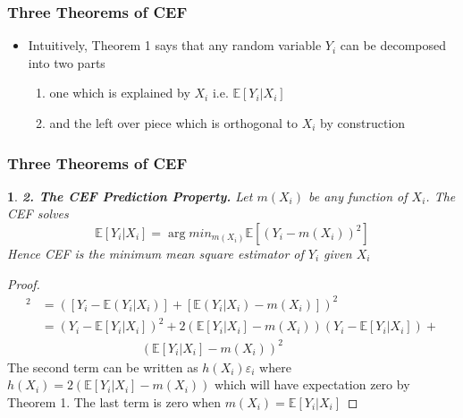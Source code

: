 \documentclass{beamer}
\theoremstyle{plain}
\newtheorem*{customthm}{} %
\newcommand{\customtheorem}[2]{
	\begin{customthm}
		\textbf{#1.} #2
	\end{customthm}
}
\begin{document}
\begin{frame}
	\frametitle{Three Theorems of CEF}
	\begin{itemize}
		\item Intuitively, Theorem 1 says  that any random variable $Y_i$ can be decomposed into two parts
		\begin{enumerate}
			\item one which is explained by $X_i$ i.e. $\mathbb E[Y_i|X_i]$
			\item and the left over piece which is orthogonal to $X_i$ by construction
		\end{enumerate}
	\end{itemize}
\end{frame}

\begin{frame}
	\frametitle{Three Theorems of CEF}

\customtheorem{2. The CEF Prediction Property}{		Let $m(X_i)$ be any function of $X_i$. The CEF solves 	
	$$ \mathbb E[Y_i| X_i] = \arg min_{m(X_i)} \mathbb E[(Y_i - m(X_i))^2] $$
	Hence CEF is the minimum mean square estimator of $Y_i$ given $X_i$
}
	
	\begin{proof}
		\begin{align*}
			[Y_i - m(X_i)]^2 &= \left( [Y_i - \mathbb E(Y_i|X_i)] + [\mathbb E(Y_i|X_i) - m(X_i)] \right)^2\\
			&= (Y_i - \mathbb E[Y_i | X_i])^2 + 2(\mathbb E[Y_i|X_i] - m(X_i))(Y_i - \mathbb E[Y_i|X_i])  + \\ &\qquad\qquad\qquad\qquad (\mathbb E[Y_i|X_i] - m(X_i))^2
		\end{align*}
		The second term can be written as $h(X_i)\varepsilon_i$ where $h(X_i) = 2(\mathbb E[Y_i|X_i] - m(X_i))$ which will have expectation zero by Theorem 1. The last term is zero when $m(X_i) = \mathbb E[Y_i|X_i]$
	\end{proof}
	
\end{frame}
\end{document}

